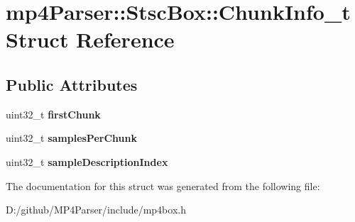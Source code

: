 \hypertarget{structmp4_parser_1_1_stsc_box_1_1_chunk_info__t}{}\section{mp4\+Parser\+::Stsc\+Box\+::Chunk\+Info\+\_\+t Struct Reference}
\label{structmp4_parser_1_1_stsc_box_1_1_chunk_info__t}
\subsection*{Public Attributes}
\begin{DoxyCompactItemize}
\item 
\mbox{\label{structmp4_parser_1_1_stsc_box_1_1_chunk_info__t_a800df5c16b6cdff2fd364794abc097aa}} 
uint32\+\_\+t {\bfseries first\+Chunk}
\item 
\mbox{\label{structmp4_parser_1_1_stsc_box_1_1_chunk_info__t_a6bd15a7ee42ca3d27c8064a9926fa58c}} 
uint32\+\_\+t {\bfseries samples\+Per\+Chunk}
\item 
\mbox{\label{structmp4_parser_1_1_stsc_box_1_1_chunk_info__t_aebbc77fc6d11a06c2756714fe6cf5fc7}} 
uint32\+\_\+t {\bfseries sample\+Description\+Index}
\end{DoxyCompactItemize}


The documentation for this struct was generated from the following file\+:\begin{DoxyCompactItemize}
\item 
D\+:/github/\+M\+P4\+Parser/include/mp4box.\+h\end{DoxyCompactItemize}
